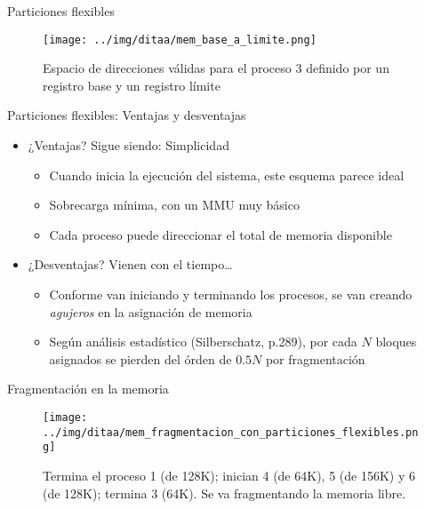 \documentclass[presentation]{beamer}
\begin{document}
\begin{frame}[label={sec:org30b7265}]{Particiones flexibles}
\begin{figure}[htbp]
\centering
\texttt{[image: ../img/ditaa/mem\_base\_a\_limite.png]}
\caption{Espacio de direcciones válidas para el proceso 3 definido por un registro base y un registro límite}
\end{figure}
\end{frame}

\begin{frame}[label={sec:org9b351e5}]{Particiones flexibles: Ventajas y desventajas}
\begin{itemize}
\item ¿Ventajas? Sigue siendo: Simplicidad
\begin{itemize}
\item Cuando inicia la ejecución del sistema, este esquema parece ideal
\item Sobrecarga mínima, con un MMU muy básico
\item Cada proceso puede direccionar el total de memoria disponible
\end{itemize}
\item ¿Desventajas? Vienen con el tiempo\ldots{}
\begin{itemize}
\item Conforme van iniciando y terminando los procesos, se van creando
\emph{agujeros} en la asignación de memoria
\item Según análisis estadístico (Silberschatz, p.289), por cada \(N\)
bloques asignados se pierden del órden de \(0.5N\) por fragmentación
\end{itemize}
\end{itemize}
\end{frame}

\begin{frame}[label={sec:orgfd7be39}]{Fragmentación en la memoria}
\begin{figure}[htbp]
\centering
\texttt{[image: ../img/ditaa/mem\_fragmentacion\_con\_particiones\_flexibles.png]}
\caption{Termina el proceso 1 (de 128K); inician 4 (de 64K), 5 (de 156K) y 6 (de 128K); termina 3 (64K). Se va fragmentando la memoria libre.}
\end{figure}
\end{frame}
\end{document}
